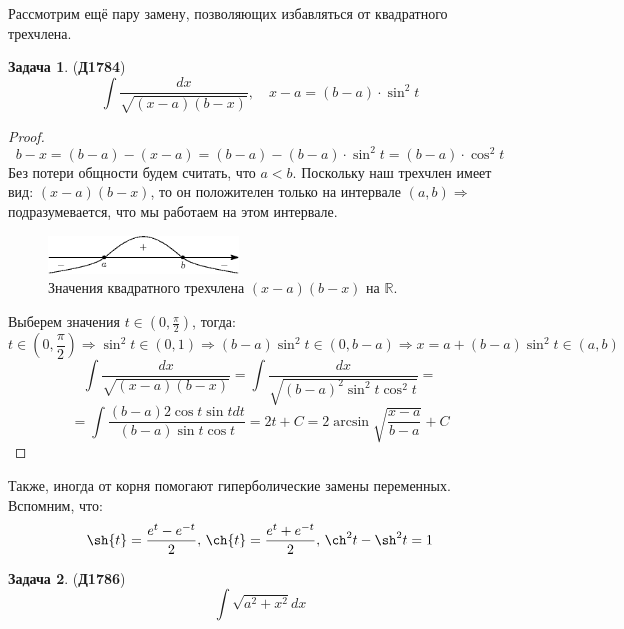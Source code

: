 \documentclass[12pt]{article}
\newcommand{\MR}{\mathbb{R}}
\theoremstyle{definition}
\newtheorem{problem}{Задача}
\DeclareMathOperator{\dint}{\displaystyle\int}
\begin{document}
Рассмотрим ещё пару замену, позволяющих избавляться от квадратного трехчлена.
\begin{problem}(\textbf{Д1784})
	$$
		\dint \dfrac{dx}{\sqrt{(x - a)(b- x)}}, \quad x - a = (b - a){\cdot}\sin^2{t}
	$$
\end{problem}
\begin{proof}
	$$
		b - x = (b - a) - (x - a) = (b - a) - (b - a){\cdot}\sin^2{t} = (b-a){\cdot}\cos^2{t}
	$$
	Без потери общности будем считать, что $a < b$. Поскольку наш трехчлен имеет вид: $(x - a)(b - x)$, то он положителен только на интервале $(a,b) \Rightarrow $ подразумевается, что мы работаем на этом интервале. 
	\begin{figure}[H]
		\centering
		\includegraphics[width=0.45\textwidth]{MA2S2_1.eps}
		\caption{Значения квадратного трехчлена $(x-a)(b-x)$ на $\MR$.}
		\label{2_1}
	\end{figure}
	Выберем значения $t \in \left(0,\frac{\pi}{2}\right)$, тогда: 
	$$
		t \in \left(0,\frac{\pi}{2}\right) \Rightarrow \sin^2{t} \in (0,1) \Rightarrow (b-a)\sin^2{t} \in (0, b-a) \Rightarrow x = a + (b-a)\sin^2{t} \in (a,b)
	$$
	$$
		\dint \dfrac{dx}{\sqrt{(x - a)(b- x)}} = \dint \dfrac{dx}{ \sqrt{(b-a)^2\sin^2{t}\cos^2{t}}} = 
	$$
	$$	
		=\dint \dfrac{(b -a)2\cos{t}\sin{t}dt}{(b-a)\sin{t}\cos{t}} = 2t + C = 2\arcsin{\sqrt{\dfrac{x-a}{b-a}}} + C
	$$
\end{proof}
Также, иногда от корня помогают гиперболические замены переменных. Вспомним, что:
$$
	\sh{t} = \dfrac{e^t - e^{-t}}{2}, \, \ch{t} = \dfrac{e^t + e^{-t}}{2}, \, \ch^2{t} - \sh^2{t} = 1
$$
\begin{problem}(\textbf{Д1786})
	$$
		\dint \sqrt{a^2 + x^2} dx
	$$
\end{problem}
\end{document}
